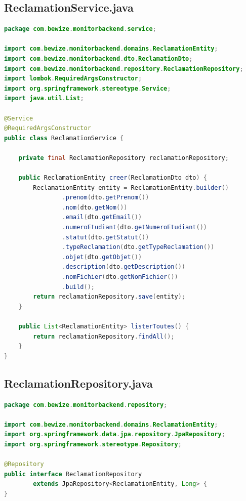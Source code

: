 \newpage
\subsection*{ReclamationService.java}
\begin{lstlisting}[language=Java]
package com.bewize.monitorbackend.service;

import com.bewize.monitorbackend.domains.ReclamationEntity;
import com.bewize.monitorbackend.dto.ReclamationDto;
import com.bewize.monitorbackend.repository.ReclamationRepository;
import lombok.RequiredArgsConstructor;
import org.springframework.stereotype.Service;
import java.util.List;

@Service
@RequiredArgsConstructor
public class ReclamationService {

    private final ReclamationRepository reclamationRepository;

    public ReclamationEntity creer(ReclamationDto dto) {
        ReclamationEntity entity = ReclamationEntity.builder()
                .prenom(dto.getPrenom())
                .nom(dto.getNom())
                .email(dto.getEmail())
                .numeroEtudiant(dto.getNumeroEtudiant())
                .statut(dto.getStatut())
                .typeReclamation(dto.getTypeReclamation())
                .objet(dto.getObjet())
                .description(dto.getDescription())
                .nomFichier(dto.getNomFichier())
                .build();
        return reclamationRepository.save(entity);
    }

    public List<ReclamationEntity> listerToutes() {
        return reclamationRepository.findAll();
    }
}
\end{lstlisting}

\newpage
\subsection*{ReclamationRepository.java}
\begin{lstlisting}[language=Java]
package com.bewize.monitorbackend.repository;

import com.bewize.monitorbackend.domains.ReclamationEntity;
import org.springframework.data.jpa.repository.JpaRepository;
import org.springframework.stereotype.Repository;

@Repository
public interface ReclamationRepository
        extends JpaRepository<ReclamationEntity, Long> {
}
\end{lstlisting}

\newpage
